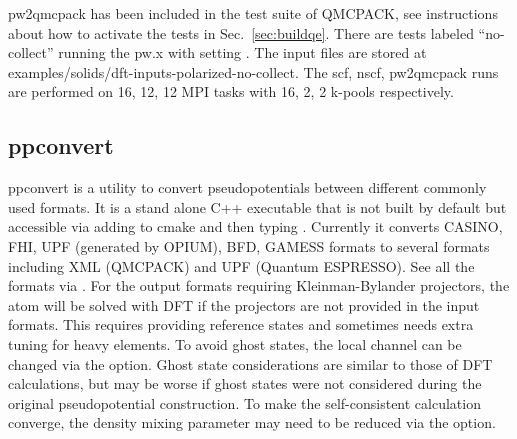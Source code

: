pw2qmcpack has been included in the test suite of QMCPACK, see instructions about how to activate the tests in Sec.~\ref{sec:buildqe}.
There are tests labeled ``no-collect'' running the pw.x with setting .
The input files are stored at examples/solids/dft-inputs-polarized-no-collect.
The scf, nscf, pw2qmcpack runs are performed on 16, 12, 12 MPI tasks with 16, 2, 2 k-pools respectively.


  \subsection{ppconvert}
    \label{sec:ppconvert}
    ppconvert is a utility to convert pseudopotentials between different commonly used formats.
    It is a stand alone C++ executable that is not built by default but accessible via adding
     to cmake and then typing .
    Currently it converts CASINO, FHI, UPF (generated by OPIUM), BFD, GAMESS formats to several formats
    including XML (QMCPACK) and UPF (Quantum ESPRESSO). See all the formats via .
    For the output formats requiring Kleinman-Bylander projectors, the atom will be solved with DFT
    if the projectors are not provided in the input formats.
    This requires providing reference states and sometimes needs extra tuning for heavy elements.
    To avoid ghost states, the local channel can be changed via the  option. Ghost state considerations are similar to those of DFT calculations, but may be worse if ghost states were not considered during the original pseudopotential construction.
    To make the self-consistent calculation converge, the density mixing parameter may need to be reduced
    via the  option.

